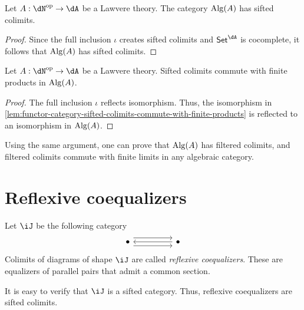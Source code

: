 \documentclass{zett}
\begin{document}
\begin{thm}\label{thm:algebraic-categories-has-sifted-colimits}
  Let $A : \dN\op \to \dA$ be a Lawvere theory.
  The category $\operatorname{Alg}(A)$ has sifted colimits.
\end{thm}
\begin{proof}
  Since the full inclusion $\iota$ creates sifted colimits and $\CSet^{\dA}$ is cocomplete, it follows that $\operatorname{Alg}(A)$ has sifted colimits.
\end{proof}

\begin{cor}
  Let $A : \dN\op \to \dA$ be a Lawvere theory.
  Sifted colimits commute with finite products in $\operatorname{Alg}(A)$.
\end{cor}
\begin{proof}
  The full inclusion $\iota$ reflects isomorphism.
  Thus, the isomorphism in \cref{lem:functor-category-sifted-colimits-commute-with-finite-products} is reflected to an isomorphism in $\operatorname{Alg}(A)$.
\end{proof}

\begin{node}
  Using the same argument, one can prove that $\operatorname{Alg}(A)$ has filtered colimits, and filtered colimits commute with finite limits in any algebraic category.
\end{node}

\section{Reflexive coequalizers}
\label{sec:reflexive-coequalizers}

\begin{defn}
  Let $\iJ$ be the following category
  \[
    \begin{tikzcd}
      \bullet && \bullet
      \arrow[shift left=2, from=1-1, to=1-3]
      \arrow[shift right=2, from=1-1, to=1-3]
      \arrow[from=1-3, to=1-1]
    \end{tikzcd}
  \]
  Colimits of diagrams of shape $\iJ$ are called \emph{reflexive coequalizers}.
  These are equalizers of parallel pairs that admit a common section.
\end{defn}

\begin{node}
  It is easy to verify that $\iJ$ is a sifted category.
  Thus, reflexive coequalizers are sifted colimits.
\end{node}
\end{document}
